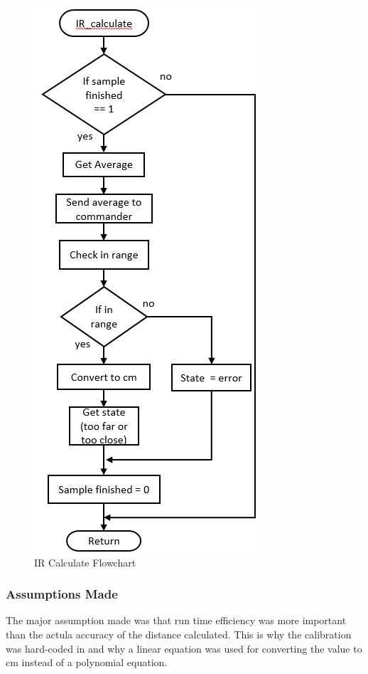\documentclass[MTRX3700report.tex]{subfiles}
\begin{document}
\begin{figure}[h]
	\includegraphics[scale=0.8]{IR_calculate.jpg}
	\centering
	\caption{IR Calculate Flowchart}
\end{figure}

\subsubsection{Assumptions Made}
The major assumption made was that run time efficiency was more important than the actula accuracy of the distance calculated. This is why the calibration was hard-coded in and why a linear equation was used for converting the value to cm instead of a polynomial equation.
\end{document}
